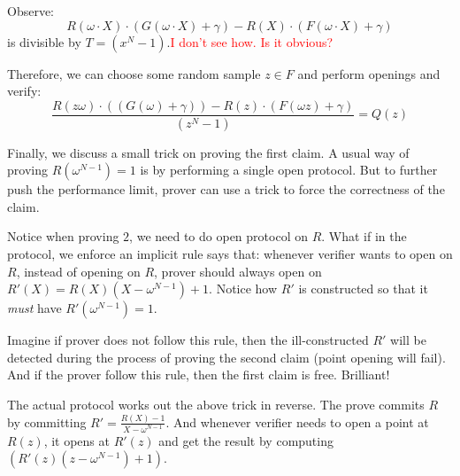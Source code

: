 \documentclass[10pt]{article}
\newcommand{\HL}[1]{\textcolor{red}{#1}}
\begin{document}
Observe:
\[
R(\omega\cdot X)\cdot(G(\omega\cdot X) + \gamma) - R(X)\cdot (F(\omega\cdot X) + \gamma)
\]
is divisible by $T = (x^N - 1)$.\HL{I don't see how. Is it obvious?}

Therefore, we can choose some random sample $z \in F$ and perform openings and
verify:
\[
    \frac{R(z \omega)\cdot ((G(\omega) + \gamma)) - R(z)\cdot(F(\omega z) + \gamma)}{(z^N - 1)} = Q(z)
\] 

Finally, we discuss a small trick
on proving the first claim. A usual way of proving $R(\omega^{N - 1})=1$  is by performing a
single open protocol. But to further push the performance limit, prover can use
a trick to force the correctness of the claim.

Notice when proving $2$, we need to do open protocol on $R$.
What if in the protocol, we enforce an implicit rule says that: whenever
verifier wants to open on $R$, instead of opening on $R$, prover should always
open on $R'(X) = R(X)(X-\omega^{N-1}) + 1$. Notice how $R'$ is constructed so
that it \emph{must} have $R'(\omega^{N-1}) = 1$.

Imagine if prover does not follow this rule, then the ill-constructed $R'$ will be
detected during the process of proving the second claim (point opening will
fail). And if the prover follow this rule, then the first claim is free.
Brilliant!

The actual protocol works out the above trick in reverse.
The prove commits $R$ by committing $R' = \frac{R(X)-1}{X-\omega^{N-1}}$.
And whenever verifier needs to open a point at $R(z)$, it opens at $R'(z)$ and
get the result by computing $(R'(z) (z-\omega^{N-1}) + 1)$.

\end{document}
